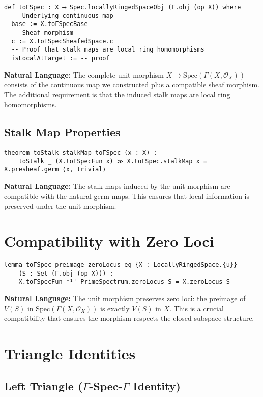 \documentclass{article}
\theoremstyle{definition}
\begin{document}
\begin{lstlisting}
def toΓSpec : X ⟶ Spec.locallyRingedSpaceObj (Γ.obj (op X)) where
  -- Underlying continuous map
  base := X.toΓSpecBase
  -- Sheaf morphism  
  c := X.toΓSpecSheafedSpace.c
  -- Proof that stalk maps are local ring homomorphisms
  isLocalAtTarget := -- proof
\end{lstlisting}

\textbf{Natural Language:} The complete unit morphism $X \to \mathrm{Spec}(\Gamma(X, \mathcal{O}_X))$ consists of the continuous map we constructed plus a compatible sheaf morphism. The additional requirement is that the induced stalk maps are local ring homomorphisms.

\subsection{Stalk Map Properties}

\begin{lstlisting}
theorem toStalk_stalkMap_toΓSpec (x : X) :
    toStalk _ (X.toΓSpecFun x) ≫ X.toΓSpec.stalkMap x = X.presheaf.germ ⟨x, trivial⟩
\end{lstlisting}

\textbf{Natural Language:} The stalk maps induced by the unit morphism are compatible with the natural germ maps. This ensures that local information is preserved under the unit morphism.

\section{Compatibility with Zero Loci}

\begin{lstlisting}
lemma toΓSpec_preimage_zeroLocus_eq {X : LocallyRingedSpace.{u}}
    (S : Set (Γ.obj (op X))) :
    X.toΓSpecFun ⁻¹' PrimeSpectrum.zeroLocus S = X.zeroLocus S
\end{lstlisting}

\textbf{Natural Language:} The unit morphism preserves zero loci: the preimage of $V(S)$ in $\mathrm{Spec}(\Gamma(X, \mathcal{O}_X))$ is exactly $V(S)$ in $X$. This is a crucial compatibility that ensures the morphism respects the closed subspace structure.

\section{Triangle Identities}

\subsection{Left Triangle ($\Gamma$-Spec-$\Gamma$ Identity)}
\end{document}
